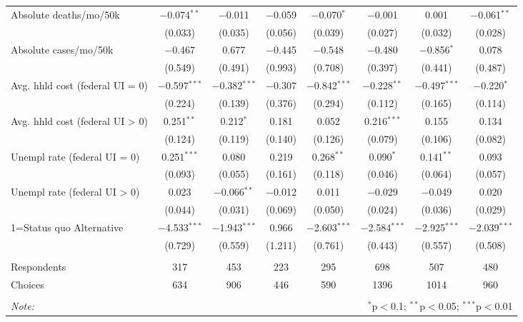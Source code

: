 \begin{table}[!htbp]
\begin{tabular}{@{\extracolsep{5pt}}lccccccc}
 Absolute deaths/mo/50k & $-$0.074$^{**}$ & $-$0.011 & $-$0.059 & $-$0.070$^{*}$ & $-$0.001 & 0.001 & $-$0.061$^{**}$ \\ 
  & (0.033) & (0.035) & (0.056) & (0.039) & (0.027) & (0.032) & (0.028) \\ 
  Absolute cases/mo/50k & $-$0.467 & 0.677 & $-$0.445 & $-$0.548 & $-$0.480 & $-$0.856$^{*}$ & 0.078 \\ 
  & (0.549) & (0.491) & (0.993) & (0.708) & (0.397) & (0.441) & (0.487) \\ 
  Avg. hhld cost (federal UI = 0) & $-$0.597$^{***}$ & $-$0.382$^{***}$ & $-$0.307 & $-$0.842$^{***}$ & $-$0.228$^{**}$ & $-$0.497$^{***}$ & $-$0.220$^{*}$ \\ 
  & (0.224) & (0.139) & (0.376) & (0.294) & (0.112) & (0.165) & (0.114) \\ 
  Avg. hhld cost (federal UI > 0) & 0.251$^{**}$ & 0.212$^{*}$ & 0.181 & 0.052 & 0.216$^{***}$ & 0.155 & 0.134 \\ 
  & (0.124) & (0.119) & (0.140) & (0.126) & (0.079) & (0.106) & (0.082) \\ 
  Unempl rate (federal UI = 0) & 0.251$^{***}$ & 0.080 & 0.219 & 0.268$^{**}$ & 0.090$^{*}$ & 0.141$^{**}$ & 0.093 \\ 
  & (0.093) & (0.055) & (0.161) & (0.118) & (0.046) & (0.064) & (0.057) \\ 
  Unempl rate (federal UI > 0) & 0.023 & $-$0.066$^{**}$ & $-$0.012 & 0.011 & $-$0.029 & $-$0.049 & 0.020 \\ 
  & (0.044) & (0.031) & (0.069) & (0.050) & (0.024) & (0.036) & (0.029) \\ 
  1=Status quo Alternative & $-$4.533$^{***}$ & $-$1.943$^{***}$ & 0.966 & $-$2.603$^{***}$ & $-$2.584$^{***}$ & $-$2.925$^{***}$ & $-$2.039$^{***}$ \\ 
  & (0.729) & (0.559) & (1.211) & (0.761) & (0.443) & (0.557) & (0.508) \\ 
 \hline \\[-1.8ex] 
Respondents & 317 & 453 & 223 & 295 & 698 & 507 & 480\\ 
 Choices & 634 & 906 & 446 & 590 & 1396 & 1014 & 960\\ 
\hline 
\hline \\[-1.8ex] 
\textit{Note:}  & \multicolumn{7}{r}{$^{*}$p$<$0.1; $^{**}$p$<$0.05; $^{***}$p$<$0.01} \\ 
\end{tabular} 
\end{table} 
